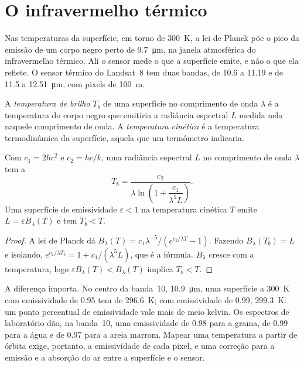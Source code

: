 \section{O infravermelho térmico}\label{sec:b3:remote-sensing-gis:thermal}

Nas temperaturas da superfície, em torno de \qty{300}{K}, a lei de Planck põe
o pico da emissão de um corpo negro perto de \qty{9.7}{\micro\metre}, na
janela atmosférica do infravermelho térmico. Ali o sensor mede o que
a superfície emite, e não o que ela reflete. O sensor térmico do Landsat~8
tem duas bandas, de 10.6 a 11.19 e de 11.5 a \qty{12.51}{\micro\metre}, com
pixels de \qty{100}{m}.

\begin{definition}\label{def:b3:remote-sensing-gis:brightness}
A \emph{temperatura de brilho} $T_b$ de uma
superfície no comprimento de onda $\lambda$ é a temperatura do corpo negro
que emitiria a radiância espectral $L$ medida nela naquele
comprimento de onda. A \emph{temperatura cinética} é a temperatura termodinâmica da
superfície, aquela que um termômetro indicaria.
\end{definition}

\begin{proposition}\label{prop:b3:remote-sensing-gis:planck-inversion}
Com $c_1 = 2hc^2$ e $c_2 = hc/k$, uma radiância espectral $L$ no
comprimento de onda $\lambda$ tem a 
\[
T_b = \frac{c_2}{\lambda \ln\!\left(1 + \dfrac{c_1}{\lambda^5 L}\right)} .
\]
Uma superfície de emissividade $\varepsilon < 1$ na temperatura cinética $T$
emite $L = \varepsilon B_\lambda(T)$ e tem $T_b < T$.
\end{proposition}

\begin{proof}
A lei de Planck dá $B_\lambda(T) = c_1\lambda^{-5}/(e^{c_2/\lambda T} -
1)$. Fazendo $B_\lambda(T_b) = L$ e isolando, $e^{c_2/\lambda T_b} = 1 +
c_1/(\lambda^5L)$, que é a fórmula. $B_\lambda$ cresce com a
temperatura, logo $\varepsilon B_\lambda(T) < B_\lambda(T)$ implica $T_b < T$.
\end{proof}

A diferença importa. No centro da banda~10, \qty{10.9}{\micro\metre},
uma superfície a \qty{300}{K} com emissividade de 0.95 tem 
de \qty{296.6}{K}; com emissividade de 0.99, \qty{299.3}{K}: um ponto percentual de
emissividade vale mais de meio kelvin. Os espectros de laboratório dão,
na banda~10, uma emissividade de 0.98 para a grama, de 0.99 para a água e
de 0.97 para a areia marrom. Mapear uma temperatura a partir de órbita exige, portanto,
a emissividade de cada pixel, e uma correção para a emissão e a
absorção do ar entre a superfície e o sensor.

